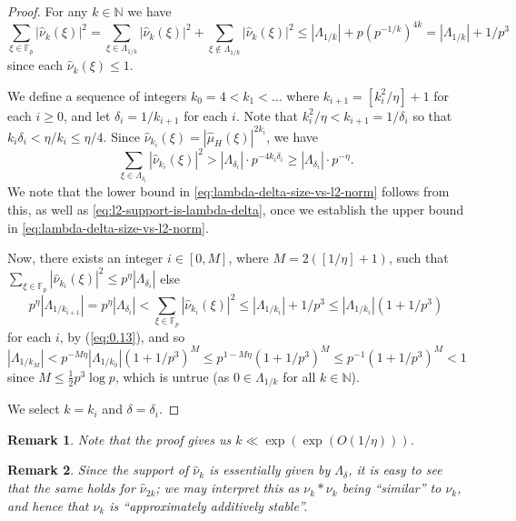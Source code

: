 \documentclass[11pt]{amsart}
\newtheorem{remark}{Remark}
\newcommand{\fp}{\mathbb{F}_p}
\newcommand{\nuhat}{{\widehat{\nu}}}
\newcommand{\muhat}{{\widehat{\mu}}}
\newcommand{\N}{{\mathbb{N}}}
\begin{document}
\begin{proof}
For any $k \in \N$  we have
\begin{equation}  \label{eq:0.13}
\sum_{\xi \in \fp} |\nuhat_k(\xi)|^2 =   \sum_{\xi \in
\Lambda_{1/k}} |\nuhat_k(\xi)|^2 + \sum_{\xi \not \in \Lambda_{1/k}}
|\nuhat_k(\xi)|^2 \leq |\Lambda_{1/k}| + p (p^{-1/k})^{4k} =
|\Lambda_{1/k}|+1/p^3
\end{equation}
since each $\nuhat_k(\xi) \leq 1$.

We define a sequence of integers $k_0 = 4<k_1<\dots$ where
$k_{i+1} = [k_i^2/\eta]+1$ for each $i\geq 0$, and let  $\delta_i
= 1/k_{i+1}$ for each $i$. Note that $k_i^2/\eta <
k_{i+1}=1/\delta_i$ so that $k_i\delta_i<\eta/k_i\leq \eta/4$.
Since $\nuhat_{k_i}(\xi) = |\muhat_H(\xi)|^{2k_i}$, we have
$$
\sum_{\xi \in \Lambda_{\delta_i}} |\nuhat_{k_i}(\xi)|^2 >
|\Lambda_{\delta_i}| \cdot p^{-4k_i \delta_i} \geq
|\Lambda_{\delta_i}| \cdot p^{-\eta} .
$$
We note that the lower bound in
\eqref{eq:lambda-delta-size-vs-l2-norm} follows 
from this, as well as \eqref{eq:l2-support-is-lambda-delta}, once we
establish the upper bound in
\eqref{eq:lambda-delta-size-vs-l2-norm}.

Now, there exists an integer $i\in [0,M]$, where $M=2([1/\eta]+1)$,
such that $\sum_{\xi \in \fp} |\nuhat_{k_i}(\xi)|^2 \leq p^{\eta}
|\Lambda_{\delta_i}|$ else
$$
p^{\eta} |\Lambda_{1/k_{i+1}}| = p^{\eta} |\Lambda_{\delta_i}| <
\sum_{\xi \in \fp} |\nuhat_{k_i}(\xi)|^2 \leq |\Lambda_{1/k_i}| +
1/p^3 \leq |\Lambda_{1/k_i}|(1 + 1/p^3)
$$
for each $i$, by (\ref{eq:0.13}), and so
$$
|\Lambda_{1/k_M}| < p^{-M \eta} |\Lambda_{1/k_0}|(1 + 1/p^3)^M
\leq p^{1-M \eta} (1 + 1/p^3)^M \leq p^{-1} (1 + 1/p^3)^M<1
$$
since $M\leq \frac 12 p^3\log p$, which is untrue (as  $0 \in
\Lambda_{1/k}$ for all $k \in \N$).

We select $k=k_i$ and $\delta=\delta_i$.
\end{proof}


\begin{remark}
Note that the proof gives us $k\ll \exp(\exp(O(1/\eta)))$.
\end{remark}

\begin{remark}
\label{rem:statistical-additive-stability}
Since the support of $\nuhat_k$ is essentially given by
$\Lambda_\delta$, it is easy to see that the same holds for
$\nuhat_{2k}$; we may interpret this as $\nu_k \ast \nu_k$ being
``similar'' to $\nu_k$, and hence that  $\nu_k$ is ``approximately
additively stable''.
\end{remark}
\end{document}
